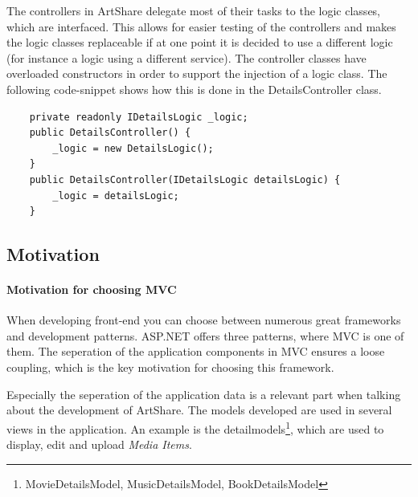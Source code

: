 \documentclass[../report.tex]{subfiles}
\begin{document}
The controllers in ArtShare delegate most of their tasks to the logic classes, which are interfaced. This allows for easier testing of the controllers and makes the logic classes replaceable if at one point it is decided to use a different logic (for instance a logic using a different service). The controller classes have overloaded constructors in order to support the injection of a logic class. The following code-snippet shows how this is done in the DetailsController class.

\begin{lstlisting}
	private readonly IDetailsLogic _logic;
	public DetailsController() {
		_logic = new DetailsLogic();
	}
	public DetailsController(IDetailsLogic detailsLogic) {
		_logic = detailsLogic;
	}
\end{lstlisting}




\subsection{Motivation}

\paragraph{Motivation for choosing MVC}
When developing front-end you can choose between numerous great frameworks and development patterns. ASP.NET offers three patterns, where MVC is one of them. The seperation of the application components in MVC ensures a loose coupling, which is the key motivation for choosing this framework.

Especially the seperation of the application data is a relevant part when talking about the development of ArtShare. The models developed are used in several views in the application. An example is the detailmodels\footnote{MovieDetailsModel, MusicDetailsModel, BookDetailsModel}, which are used to display, edit and upload \textit{Media Items}.
\end{document}
